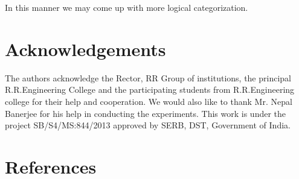 \documentclass[review]{elsarticle}
\begin{document}
In this manner we may come up with more logical categorization.
\noindent
\vskip5pt



\section*{Acknowledgements}
The authors acknowledge the Rector, RR Group of institutions, the principal R.R.Engineering College and the participating students from R.R.Engineering college for their help and cooperation. We would also like to thank Mr. Nepal Banerjee for his help in conducting the experiments. This work is under the project SB/S4/MS:844/2013 approved by SERB, DST, Government of India.                             
                    



\section*{References}


\end{document}
